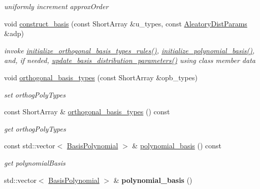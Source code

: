 \begin{DoxyCompactItemize}
\begin{DoxyCompactList}\small\item\em uniformly increment approx\+Order \end{DoxyCompactList}\item 
void \hyperlink{classPecos_1_1SharedOrthogPolyApproxData_a402d2fb8bc3072b9a776c318f4b17876}{construct\+\_\+basis} (const Short\+Array \&u\+\_\+types, const \hyperlink{classPecos_1_1AleatoryDistParams}{Aleatory\+Dist\+Params} \&adp)
\begin{DoxyCompactList}\small\item\em invoke \hyperlink{classPecos_1_1SharedPolyApproxData_a5c55db28633dec7b4247ae239a8667fc}{initialize\+\_\+orthogonal\+\_\+basis\+\_\+types\+\_\+rules()}, \hyperlink{classPecos_1_1SharedPolyApproxData_a9761a3bbd8c1737710737752432b533a}{initialize\+\_\+polynomial\+\_\+basis()}, and, if needed, \hyperlink{classPecos_1_1SharedPolyApproxData_a97e10bdee50a60499d893502e8294409}{update\+\_\+basis\+\_\+distribution\+\_\+parameters()} using class member data \end{DoxyCompactList}\item 
void \hyperlink{classPecos_1_1SharedOrthogPolyApproxData_a83698dfb63484a5597628520af248a3c}{orthogonal\+\_\+basis\+\_\+types} (const Short\+Array \&opb\+\_\+types)\label{classPecos_1_1SharedOrthogPolyApproxData_a83698dfb63484a5597628520af248a3c}

\begin{DoxyCompactList}\small\item\em set orthog\+Poly\+Types \end{DoxyCompactList}\item 
const Short\+Array \& \hyperlink{classPecos_1_1SharedOrthogPolyApproxData_aa1eeaf0ce77b0256fdf4029c5af524c9}{orthogonal\+\_\+basis\+\_\+types} () const \label{classPecos_1_1SharedOrthogPolyApproxData_aa1eeaf0ce77b0256fdf4029c5af524c9}

\begin{DoxyCompactList}\small\item\em get orthog\+Poly\+Types \end{DoxyCompactList}\item 
const std\+::vector$<$ \hyperlink{classPecos_1_1BasisPolynomial}{Basis\+Polynomial} $>$ \& \hyperlink{classPecos_1_1SharedOrthogPolyApproxData_a7282b8c27142b1b15cd79922c3f55e19}{polynomial\+\_\+basis} () const \label{classPecos_1_1SharedOrthogPolyApproxData_a7282b8c27142b1b15cd79922c3f55e19}

\begin{DoxyCompactList}\small\item\em get polynomial\+Basis \end{DoxyCompactList}\item 
std\+::vector$<$ \hyperlink{classPecos_1_1BasisPolynomial}{Basis\+Polynomial} $>$ \& {\bfseries polynomial\+\_\+basis} ()\label{classPecos_1_1SharedOrthogPolyApproxData_a0958a377f681f87abc3960133952ea67}


\end{DoxyCompactItemize}
